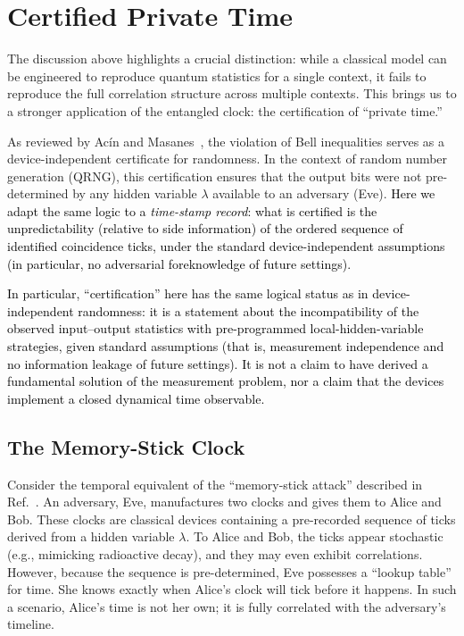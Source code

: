 \documentclass[reprint,aps,pra,longbibliography]{revtex4-2}
\newcommand{\rev}[1]{\textcolor{black}{#1}} %
\newcommand{\revG}[1]{\textcolor{black}{#1}} %
\begin{document}
\section{Certified Private Time}
\label{sec:certified-private-time}

The discussion above highlights a crucial distinction: while a classical model can be engineered to reproduce quantum statistics for a single context, it fails to reproduce the full correlation structure across multiple contexts. This brings us to a stronger application of the entangled clock: the certification of ``private time.''

As reviewed by Ac\'in and Masanes~\cite{Acin2016CertifiedRandomness}, the violation of Bell inequalities serves as a device-independent certificate for randomness. In the context of random number generation (QRNG), this certification ensures that the output bits were not pre-determined by any hidden variable $\lambda$ available to an adversary (Eve). \rev{Here we adapt the same logic to a \emph{time-stamp record}: what is certified is the unpredictability (relative to side information) of the ordered sequence of identified coincidence ticks, under the standard device-independent assumptions (in particular, no adversarial foreknowledge of future settings).}

\revG{In particular, ``certification'' here has the same logical status as in device-independent randomness: it is a statement about the incompatibility of the observed input--output statistics with pre-programmed local-hidden-variable strategies, given standard assumptions (that is, measurement independence and no information leakage of future settings). It is not a claim to have derived a fundamental solution of the measurement problem, nor a claim that the devices implement a closed dynamical time observable.}

\subsection{The Memory-Stick Clock}
Consider the temporal equivalent of the ``memory-stick attack'' described in Ref.~\cite{Acin2016CertifiedRandomness}. An adversary, Eve, manufactures two clocks and gives them to Alice and Bob. These clocks are classical devices containing a pre-recorded sequence of ticks derived from a hidden variable $\lambda$. To Alice and Bob, the ticks appear stochastic (e.g., mimicking radioactive decay), and they may even exhibit correlations. However, because the sequence is pre-determined, Eve possesses a ``lookup table'' for time. She knows exactly when Alice's clock will tick before it happens. In such a scenario, Alice's time is not her own; it is fully correlated with the adversary's timeline.
\end{document}
